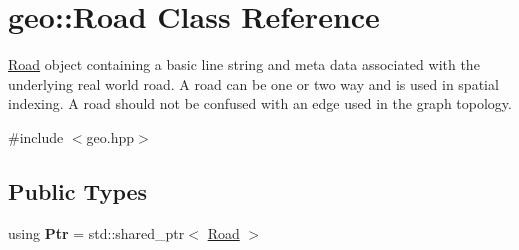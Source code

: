\hypertarget{classgeo_1_1Road}{}\section{geo\+:\+:Road Class Reference}
\label{classgeo_1_1Road}


\hyperlink{classgeo_1_1Road}{Road} object containing a basic line string and meta data associated with the underlying real world road. A road can be one or two way and is used in spatial indexing. A road should not be confused with an edge used in the graph topology.  




{\ttfamily \#include $<$geo.\+hpp$>$}

\subsection*{Public Types}
\begin{DoxyCompactItemize}
\item 
using {\bfseries Ptr} = std\+::shared\+\_\+ptr$<$ \hyperlink{classgeo_1_1Road}{Road} $>$\hypertarget{classgeo_1_1Road_a1bd5a576d8c09aa43ae8b638f2e896de}{}\label{classgeo_1_1Road_a1bd5a576d8c09aa43ae8b638f2e896de}

\end{DoxyCompactItemize}
